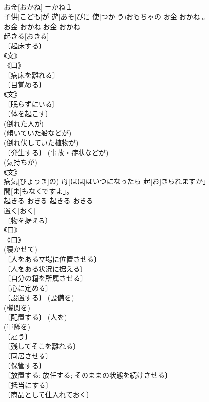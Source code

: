 \documentclass[8pt]{extreport}
\begin{document}
\begin{CJK}{UTF8}{min}
\\	お金[おかね]	＝かね１ 
\\	子供[こども]が 遊[あそ]びに 使[つか]う)おもちゃの お金[おかね]。	
\\	お金	おかね	お金	おかね	
\\	起きる[おきる]	
\\	〔起床する〕 
\\	《文》 
\\	《口》 
\\	〔病床を離れる〕 
\\	〔目覚める〕 
\\	《文》 
\\	〔眠らずにいる〕 
\\	〔体を起こす〕 
\\	(倒れた人が) 
\\	(傾いていた船などが) 
\\	(倒れ伏していた植物が) 
\\	〔発生する〕 (事故・症状などが) 
\\	(気持ちが) 
\\	《文》 
\\	病気[びょうき]の) 母[はは]はいつになったら 起[お]きられますか」
\\	間[ま]もなくですよ」。	
\\	起きる	おきる	起きる	おきる	
\\	置く[おく]	
\\	〔物を据える〕 
\\	《口》 
\\	《口》 
\\	(寝かせて) 
\\	〔人をある立場に位置させる〕 
\\	〔人をある状況に据える〕 
\\	〔自分の籍を所属させる〕 
\\	〔心に定める〕 
\\	〔設置する〕 (設備を) 
\\	(機関を) 
\\	〔配置する〕 (人を) 
\\	(軍隊を) 
\\	〔雇う〕 
\\	〔残してそこを離れる〕 
\\	〔同居させる〕 
\\	〔保管する〕 
\\	〔放置する; 放任する; そのままの状態を続けさせる〕 
\\	〔抵当にする〕 
\\	〔商品として仕入れておく〕 

\end{CJK}
\end{document}
